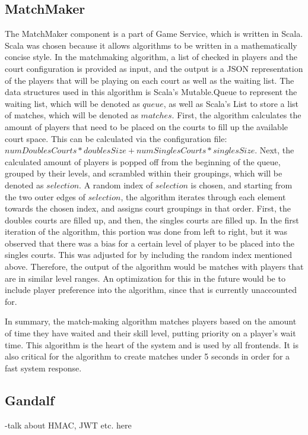 \documentclass{article}
\begin{document}
\subsection{MatchMaker}
The MatchMaker component is a part of Game Service, which is written in Scala. Scala was chosen because it allows algorithms to be written in a mathematically concise style. In the matchmaking algorithm, a list of checked in players and the court configuration is provided as input, and the output is a JSON representation of the players that will be playing on each court as well as the waiting list. The data structures used in this algorithm is Scala's Mutable.Queue to represent the waiting list, which will be denoted as $queue$, as well as Scala's List to store a list of matches, which will be denoted as $matches$. First, the algorithm calculates the amount of players that need to be placed on the courts to fill up the available court space. This can be calculated via the configuration file: $numDoublesCourts * doublesSize + numSinglesCourts * singlesSize$. Next, the calculated amount of players is popped off from the beginning of the queue, grouped by their levels, and scrambled within their groupings, which will be denoted as $selection$. A random index of $selection$ is chosen, and starting from the two outer edges of $selection$, the algorithm iterates through each element towards the chosen index, and assigns court groupings in that order. First, the doubles courts are filled up, and then, the singles courts are filled up. In the first iteration of the algorithm, this portion was done from left to right, but it was observed that there was a bias for a certain level of player to be placed into the singles courts. This was adjusted for by including the random index mentioned above. Therefore, the output of the algorithm would be matches with players that are in similar level ranges. An optimization for this in the future would be to include player preference into the algorithm, since that is currently unaccounted for.

In summary, the match-making algorithm matches players based on the amount of time they have waited and their skill level, putting priority on a player's wait time. This algorithm is the heart of the system and is used by all frontends. It is also critical for the algorithm to create matches under 5 seconds in order for a fast system response.

\subsection{Gandalf}
-talk about HMAC, JWT etc. here
\end{document}
